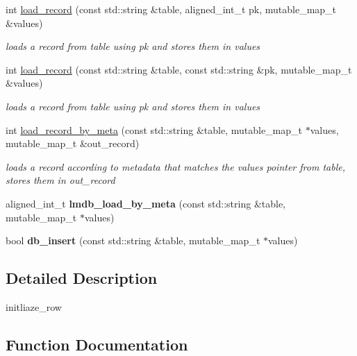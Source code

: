\begin{DoxyCompactItemize}
int \hyperlink{namespacemods_1_1db_acf6aefd449f5fcb8d9987a37cc1d7ba8}{load\+\_\+record} (const std\+::string \&table, aligned\+\_\+int\+\_\+t pk, mutable\+\_\+map\+\_\+t \&values)
\begin{DoxyCompactList}\small\item\em loads a record from table using pk and stores them in values \end{DoxyCompactList}\item 
int \hyperlink{namespacemods_1_1db_a0e743f7d6ff025f86a1bdbcc9b726e8c}{load\+\_\+record} (const std\+::string \&table, const std\+::string \&pk, mutable\+\_\+map\+\_\+t \&values)
\begin{DoxyCompactList}\small\item\em loads a record from table using pk and stores them in values \end{DoxyCompactList}\item 
int \hyperlink{namespacemods_1_1db_a2ec81c8ca3ce3f3a4b27b68645bf4e1d}{load\+\_\+record\+\_\+by\+\_\+meta} (const std\+::string \&table, mutable\+\_\+map\+\_\+t $\ast$values, mutable\+\_\+map\+\_\+t \&out\+\_\+record)
\begin{DoxyCompactList}\small\item\em loads a record according to metadata that matches the values pointer from table, stores them in out\+\_\+record \end{DoxyCompactList}\item 
\mbox{\label{namespacemods_1_1db_ab14e0409a2059b7d3cadbba2c1712ead}} 
aligned\+\_\+int\+\_\+t {\bfseries lmdb\+\_\+load\+\_\+by\+\_\+meta} (const std\+::string \&table, mutable\+\_\+map\+\_\+t $\ast$values)
\item 
\mbox{\label{namespacemods_1_1db_a21477a1dfc16d08ecdad38983855e626}} 
bool {\bfseries db\+\_\+insert} (const std\+::string \&table, mutable\+\_\+map\+\_\+t $\ast$values)
\end{DoxyCompactItemize}


\subsection{Detailed Description}
initliaze\+\_\+row 

\subsection{Function Documentation}
\mbox{\label{namespacemods_1_1db_ae6cd02ca445ea237caf3b63fd5c7c36b}} 
